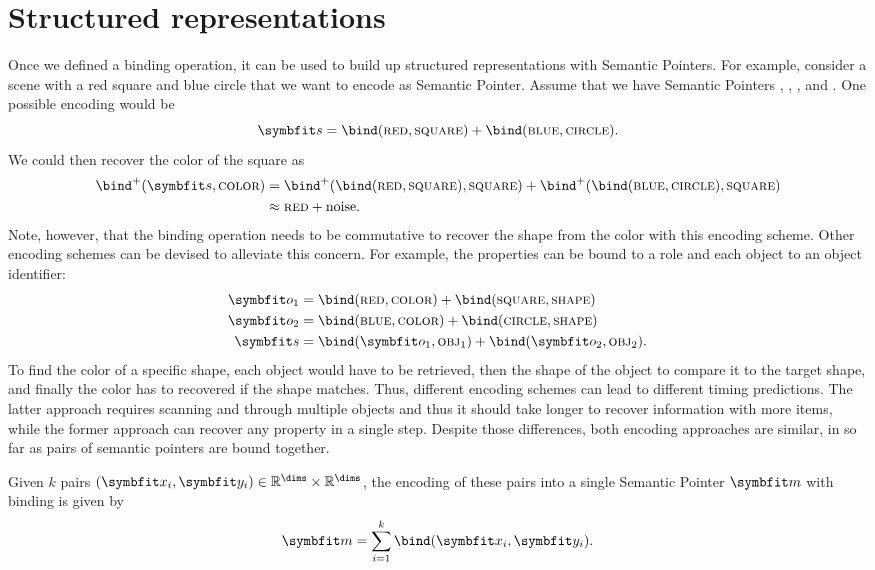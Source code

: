 \section{Structured representations}
Once we defined a binding operation, it can be used to build up structured representations with Semantic Pointers.
For example, consider a scene with a red square and blue circle that we want to encode as Semantic Pointer.
Assume that we have Semantic Pointers , , , and .
One possible encoding would be
\begin{equation}
    \vc s = \bind(\spc{red}, \spc{square}) + \bind(\spc{blue}, \spc{circle}) \text{.}
\end{equation}
We could then recover the color of the square as
\begin{align}
    \bind^+(\vc s, \spc{color}) &= \bind^+(\bind(\spc{red}, \spc{square}), \spc{square}) + \bind^+(\bind(\spc{blue}, \spc{circle}), \spc{square}) \\
    &\approx \spc{red} + \mathrm{noise} \text{.}
\end{align}
Note, however, that the binding operation needs to be commutative to recover the shape from the color with this encoding scheme.
Other encoding schemes can be devised to alleviate this concern.
For example, the properties can be bound to a role and each object to an object identifier:
\begin{align}
    \vc o_1 &= \bind(\spc{red}, \spc{color}) + \bind(\spc{square}, \spc{shape}) \\
    \vc o_2 &= \bind(\spc{blue}, \spc{color}) + \bind(\spc{circle}, \spc{shape}) \\
    \vc s &= \bind(\vc o_1, \spc{obj}_1) + \bind(\vc o_2, \spc{obj}_2) \text{.}
\end{align}
To find the color of a specific shape, each object would have to be retrieved, then the shape of the object to compare it to the target shape, and finally the color has to recovered if the shape matches.
Thus, different encoding schemes can lead to different timing predictions.
The latter approach requires scanning and through multiple objects and thus it should take longer to recover information with more items, while the former approach can recover any property in a single step.
Despite those differences, both encoding approaches are similar, in so far as pairs of semantic pointers are bound together.
\begin{defn}
    Given $k$ pairs $(\vc x_i, \vc y_i) \in \mathbb{R}^{\dims} \times \mathbb{R}^{\dims}$, the encoding of these pairs into a single Semantic Pointer $\vc m$ with binding is given by
    \begin{equation}
        \vc m = \sum_{i=1}^k \bind(\vc x_i, \vc y_i) \text{.}
    \end{equation}
\end{defn}
